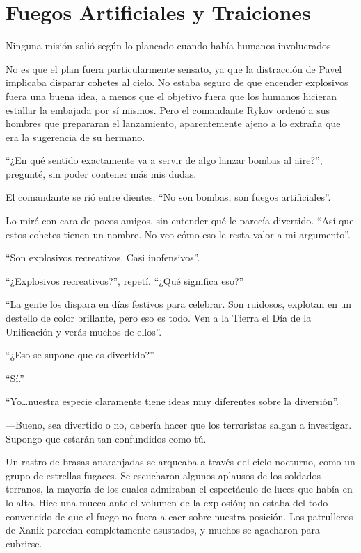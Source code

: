 \chapter{Fuegos Artificiales y Traiciones}\label{sec:fuegos-artificiales-y-traiciones}

Ninguna misión salió según lo planeado cuando había humanos involucrados.

No es que el plan fuera particularmente sensato, ya que la distracción de Pavel implicaba disparar cohetes al cielo. No estaba seguro de que encender explosivos fuera una buena idea, a menos que el objetivo fuera que los humanos hicieran estallar la embajada por sí mismos. Pero el comandante Rykov ordenó a sus hombres que prepararan el lanzamiento, aparentemente ajeno a lo extraña que era la sugerencia de su hermano.

``¿En qué sentido exactamente va a servir de algo lanzar bombas al aire?'', pregunté, sin poder contener más mis dudas.

El comandante se rió entre dientes. ``No son bombas, son fuegos artificiales''.

Lo miré con cara de pocos amigos, sin entender qué le parecía divertido. ``Así que estos cohetes tienen un nombre. No veo cómo eso le resta valor a mi argumento''.

``Son explosivos recreativos. Casi inofensivos''.

``¿Explosivos recreativos?'', repetí. ``¿Qué significa eso?''


``La gente los dispara en días festivos para celebrar. Son ruidosos, explotan en un destello de color brillante, pero eso es todo. Ven a la Tierra el Día de la Unificación y verás muchos de ellos''.

``¿Eso se supone que es divertido?''


``Sí.''


``Yo…nuestra especie claramente tiene ideas muy diferentes sobre la diversión''.

—Bueno, sea divertido o no, debería hacer que los terroristas salgan a investigar. Supongo que estarán tan confundidos como tú.

Un rastro de brasas anaranjadas se arqueaba a través del cielo nocturno, como un grupo de estrellas fugaces. Se escucharon algunos aplausos de los soldados terranos, la mayoría de los cuales admiraban el espectáculo de luces que había en lo alto. Hice una mueca ante el volumen de la explosión; no estaba del todo convencido de que el fuego no fuera a caer sobre nuestra posición. Los patrulleros de Xanik parecían completamente asustados, y muchos se agacharon para cubrirse.

